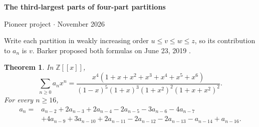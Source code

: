 \documentclass[10pt,letterpaper]{article}
\newtheorem{theorem}{Theorem}
\begin{document}
\begin{center}
{\Large\bfseries The third-largest parts of four-part partitions}\par
\medskip
Pioneer project \quad $\cdot$  November 2026
\end{center}

\begin{abstract}
Let $a_n$ be the sum of the third-largest parts over all partitions of $n$
into four positive parts. We prove the ordinary generating function and
constant-coefficient recurrence proposed by Colin Barker in OEIS A308758.
The proof uses the four gaps of a sorted partition and the linear weight
carried by the two gaps that determine its third-largest part.
\end{abstract}

Write each partition in weakly increasing order $u\leq v\leq w\leq z$, so its contribution to $a_n$ is $v$.
Barker proposed both formulas on June 23, 2019 \cite{oeis}.

\begin{theorem}\label{th:main}
In $\mathbb Z[[x]]$,
\[
\sum_{n\geq0} a_nx^n
 =\frac{x^4(1+x+x^2+x^3+x^4+x^5+x^6)}
 {(1-x)^5(1+x)^3(1+x^2)^2(1+x+x^2)^2}.
\]
For every $n\geq16$,
\begin{align*}
 a_n={}&a_{n-2}+2a_{n-3}+2a_{n-4}-2a_{n-5}-3a_{n-6}-4a_{n-7}\\
       &+4a_{n-9}+3a_{n-10}+2a_{n-11}-2a_{n-12}-2a_{n-13}-a_{n-14}+a_{n-16}.
\end{align*}
\end{theorem}
\end{document}
